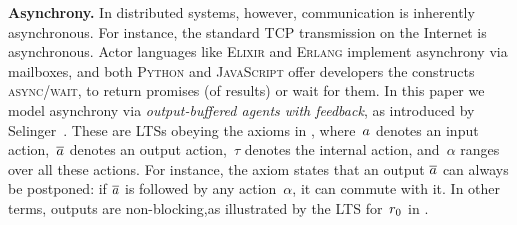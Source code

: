 





{\bfseries Asynchrony.} %
In distributed systems, however,
communication is inherently asynchronous. For instance, the standard TCP
transmission on the Internet is asynchronous.
Actor languages like \textsc{Elixir} and \textsc{Erlang}
implement asynchrony via mailboxes, and both \textsc{Python} and
\textsc{JavaScript} offer developers the constructs
\textsc{async/wait}, to return promises (of results) or wait for
them.
In this paper we model asynchrony via \emph{output-buffered agents with
feedback}, as introduced by Selinger~\cite{DBLP:conf/concur/Selinger97}.
These are LTSs obeying the axioms in , where~$\aa$ denotes
an input  action,~$\co{\aa}$ denotes an output  action,~$\tau$ denotes
the internal action, and~$\alpha$ ranges over all these actions.
For instance, the \outputcommutativity axiom states that an
output $\co{a}$ %
can always be postponed: if $\co{a}$ is followed by any action~$\alpha$,
it can commute with it.
In other terms, outputs are
non-blocking,as illustrated by the LTS for~$\client_0$ in .






